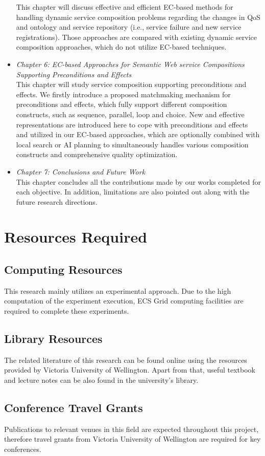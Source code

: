 \begin{itemize}
This chapter will discuss effective and efficient EC-based methods for handling dynamic service composition problems regarding the changes in QoS and ontology and service repository (i.e., service failure and new service registrations). Those approaches are compared with existing dynamic service composition approaches, which do not utilize EC-based techniques.
 \item \textit{Chapter 6: EC-based Approaches for Semantic Web service Compositions Supporting Preconditions and Effects}\\
This chapter will study service composition supporting preconditions and effects. We firstly introduce a proposed matchmaking mechanism for preconditions and effects, which fully support different composition constructs, such as sequence, parallel, loop and choice. New and effective representations are introduced here to cope with preconditions and effects and utilized in our EC-based approaches, which are optionally combined with local search or AI planning to simultaneously handles various composition constructs and comprehensive quality optimization. 
\item \textit{Chapter 7: Conclusions and Future Work}\\
This chapter concludes all the contributions made by our works completed for each objective. In addition, limitations are also pointed out along with the future research directions.
\end{itemize}


\section{Resources Required}

\subsection{Computing Resources}
This research mainly utilizes an experimental approach. Due to the high computation of the experiment execution, ECS Grid computing facilities are required to complete these experiments.

\subsection{Library Resources}
The related literature of this research can be found online using the resources provided by Victoria University of Wellington. Apart from that, useful textbook and lecture notes can be also found in the university's library.

\subsection{Conference Travel Grants}
Publications to relevant venues in this field are expected throughout this project, therefore travel grants from Victoria University of Wellington are required for key conferences.